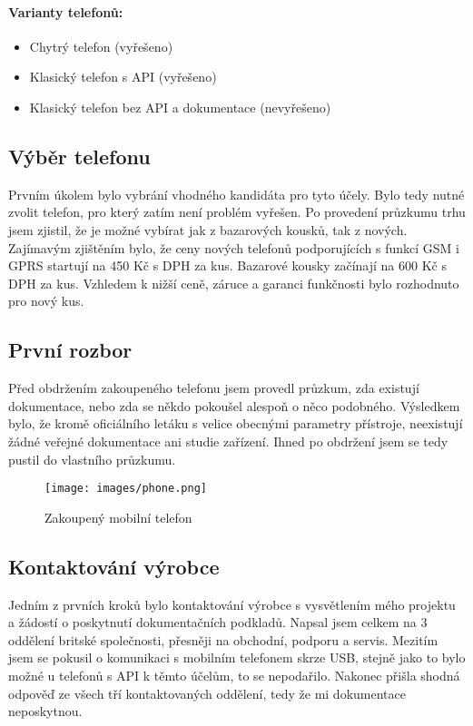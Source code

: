 \documentclass[FM,MP]{tulthesis}  %
\begin{document}
\paragraph{Varianty telefonů:}
\begin{itemize}
\item Chytrý telefon (vyřešeno)
\item Klasický telefon s API (vyřešeno)
\item Klasický telefon bez API a dokumentace (nevyřešeno)
\end{itemize} 

\subsection{Výběr telefonu}
Prvním úkolem bylo vybrání vhodného kandidáta pro tyto účely. Bylo tedy nutné zvolit telefon, pro který zatím není problém vyřešen. Po provedení průzkumu trhu jsem zjistil, že je možné vybírat jak z bazarových kousků, tak z nových. Zajímavým zjištěním bylo, že ceny nových telefonů podporujících s funkcí GSM i GPRS startují na 450 Kč s DPH za kus. Bazarové kousky začínají na 600 Kč s DPH za kus. Vzhledem k nižší ceně, záruce a garanci funkčnosti bylo rozhodnuto pro nový kus.

\subsection{První rozbor}
Před obdržením zakoupeného telefonu jsem provedl průzkum, zda existují dokumentace, nebo zda se někdo pokoušel alespoň o něco podobného. Výsledkem bylo, že kromě oficiálního letáku s velice obecnými parametry přístroje, neexistují žádné veřejné dokumentace ani studie zařízení. Ihned po obdržení jsem se tedy pustil do vlastního průzkumu.

\begin{figure}[H]
\begin{center}
\texttt{[image: images/phone.png]}
\caption{Zakoupený mobilní telefon}
\label{image}
\end{center}
\end{figure}

\subsection{Kontaktování výrobce}
Jedním z prvních kroků bylo kontaktování výrobce s vysvětlením mého projektu a žádostí o poskytnutí dokumentačních podkladů. Napsal jsem celkem na 3 oddělení britské společnosti, přesněji na obchodní, podporu a servis. Mezitím jsem se pokusil o komunikaci s mobilním telefonem skrze USB, stejně jako to bylo možné u telefonů s API k těmto účelům, to se nepodařilo. Nakonec přišla shodná odpověď ze všech tří kontaktovaných oddělení, tedy že mi dokumentace neposkytnou.
\end{document}
